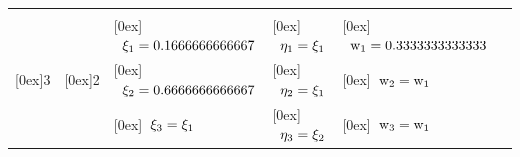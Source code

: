 \begin{table}[ht]
\begin{tabular}{|c|c|l|l|l|l|}
\hline

                                                               &                                         &                                                             &                                                               &                                                              \\
                                                               &                                         & \raisebox{0.2cm}[0ex]{$\;\;\rm \xi_1 = 0.16666 66666 667   $} & \raisebox{0.2cm}[0ex]{$\;\;\rm  \eta_1 = \xi_1       $}            & \raisebox{0.2cm}[0ex]{$\;\;\rm w_1 = 0.33333 33333 333 $}    \\
\raisebox{0.2cm}[0ex]{3}                                       & \raisebox{0.2cm}[0ex]{2}                & \raisebox{0.2cm}[0ex]{$\;\;\rm \xi_2 = 0.66666 66666 667   $} & \raisebox{0.2cm}[0ex]{$\;\;\rm  \eta_2 = \xi_1       $}            & \raisebox{0.2cm}[0ex]{$\;\;\rm w_2 = w_1 $}                  \\
                                                               &                                         & \raisebox{0.2cm}[0ex]{$\;\;\rm \xi_3 = \xi_1                 $} & \raisebox{0.2cm}[0ex]{$\;\;\rm  \eta_3 = \xi_2       $}            & \raisebox{0.2cm}[0ex]{$\;\;\rm w_3 = w_1 $}                  \\

\hline


\end{tabular}
\end{table}
